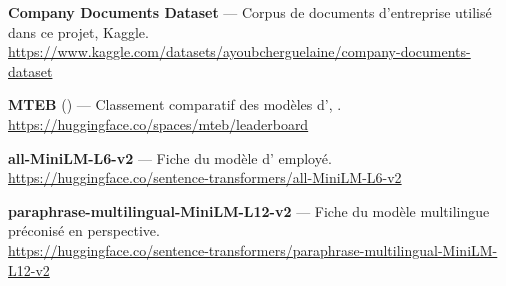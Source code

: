 \begin{enumerate}[label={[\arabic*]},leftmargin=2.2em,start=21]

\item \textbf{Company Documents Dataset} --- Corpus de documents d'entreprise
utilisé dans ce projet, Kaggle. \\
\url{https://www.kaggle.com/datasets/ayoubcherguelaine/company-documents-dataset}

\item \textbf{MTEB} () --- Classement
comparatif des modèles d', . \\
\url{https://huggingface.co/spaces/mteb/leaderboard}

\item \textbf{all-MiniLM-L6-v2} --- Fiche du modèle d' employé. \\
\url{https://huggingface.co/sentence-transformers/all-MiniLM-L6-v2}

\item \textbf{paraphrase-multilingual-MiniLM-L12-v2} --- Fiche du modèle
multilingue préconisé en perspective. \\
\url{https://huggingface.co/sentence-transformers/paraphrase-multilingual-MiniLM-L12-v2}

\end{enumerate}
